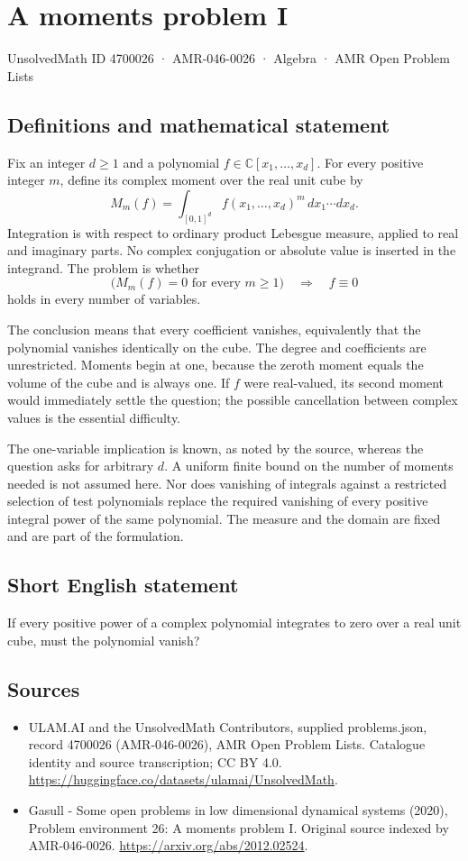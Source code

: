 \documentclass[11pt,a4paper]{article}
\begin{document}
\section*{A moments problem I}\label{4700026}
{\small UnsolvedMath ID 4700026 · AMR-046-0026 · Algebra · AMR Open Problem Lists}
\subsection{Definitions and mathematical statement}
Fix an integer $d\ge1$ and a polynomial
$f\in\mathbb C[x_1,\ldots,x_d]$. For every positive integer $m$, define
its complex moment over the real unit cube by
\[
 M_m(f)=\int_{[0,1]^d}f(x_1,\ldots,x_d)^m\,dx_1\cdots dx_d.
\]
Integration is with respect to ordinary product Lebesgue measure, applied
to real and imaginary parts. No complex conjugation or absolute value is
inserted in the integrand. The problem is whether
\[
 \bigl(M_m(f)=0\text{ for every }m\ge1\bigr)
       \quad\Longrightarrow\quad f\equiv0
\]
holds in every number of variables.

The conclusion means that every coefficient vanishes, equivalently that
the polynomial vanishes identically on the cube. The degree and coefficients
are unrestricted. Moments begin at one, because the zeroth moment equals
the volume of the cube and is always one. If $f$ were real-valued, its
second moment would immediately settle the question; the possible
cancellation between complex values is the essential difficulty.

The one-variable implication is known, as noted by the source, whereas
the question asks for arbitrary $d$. A uniform finite bound on the number
of moments needed is not assumed here. Nor does vanishing of integrals
against a restricted selection of test polynomials replace the required
vanishing of every positive integral power of the same polynomial. The
measure and the domain are fixed and are part of the formulation.
\subsection{Short English statement}
If every positive power of a complex polynomial integrates to zero over a real unit cube, must the polynomial vanish?
\subsection{Sources}
\begin{itemize}
\item[S1] ULAM.AI and the UnsolvedMath Contributors, supplied problems.json, record 4700026 (AMR-046-0026), AMR Open Problem Lists. Catalogue identity and source transcription; CC BY 4.0.
\url{https://huggingface.co/datasets/ulamai/UnsolvedMath}.
\item[S2] Gasull - Some open problems in low dimensional dynamical systems (2020), Problem environment 26: A moments problem I. Original source indexed by AMR-046-0026.
\url{https://arxiv.org/abs/2012.02524}.
\end{itemize}
\end{document}
